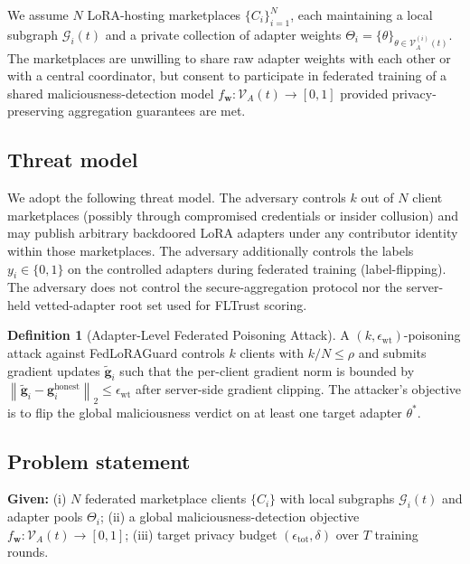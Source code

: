 \documentclass[12pt,a4paper]{article}
\theoremstyle{definition}
\newtheorem{definition}{Definition}
\theoremstyle{remark}
\newcommand{\modelname}{FedLoRAGuard}
\newcommand{\Vcal}{\mathcal{V}}
\newcommand{\Gcal}{\mathcal{G}}
\newcommand{\norm}[1]{\left\|#1\right\|}
\begin{document}
We assume $N$ LoRA-hosting marketplaces $\{C_i\}_{i=1}^N$, each maintaining a local subgraph $\Gcal_i(t)$ and a private collection of adapter weights $\Theta_i = \{\theta\}_{\theta \in \Vcal_A^{(i)}(t)}$. The marketplaces are unwilling to share raw adapter weights with each other or with a central coordinator, but consent to participate in federated training of a shared maliciousness-detection model $f_{\mathbf{w}}: \Vcal_A(t) \to [0,1]$ provided privacy-preserving aggregation guarantees are met.

\subsection{Threat model}

We adopt the following threat model. The adversary controls $k$ out of $N$ client marketplaces (possibly through compromised credentials or insider collusion) and may publish arbitrary backdoored LoRA adapters under any contributor identity within those marketplaces. The adversary additionally controls the labels $y_i \in \{0, 1\}$ on the controlled adapters during federated training (label-flipping). The adversary does not control the secure-aggregation protocol nor the server-held vetted-adapter root set used for FLTrust scoring.

\begin{definition}[Adapter-Level Federated Poisoning Attack]
\label{def:attack}
A $(k, \epsilon_{\mathrm{wt}})$-poisoning attack against \modelname{} controls $k$ clients with $k/N \leq \rho$ and submits gradient updates $\tilde{\mathbf{g}}_i$ such that the per-client gradient norm is bounded by $\norm{\tilde{\mathbf{g}}_i - \mathbf{g}_i^{\mathrm{honest}}}_2 \leq \epsilon_{\mathrm{wt}}$ after server-side gradient clipping. The attacker's objective is to flip the global maliciousness verdict on at least one target adapter $\theta^*$.
\end{definition}

\subsection{Problem statement}

\noindent\textbf{Given:} (i) $N$ federated marketplace clients $\{C_i\}$ with local subgraphs $\Gcal_i(t)$ and adapter pools $\Theta_i$; (ii) a global maliciousness-detection objective $f_{\mathbf{w}}: \Vcal_A(t) \to [0, 1]$; (iii) target privacy budget $(\epsilon_{\mathrm{tot}}, \delta)$ over $T$ training rounds.
\end{document}
